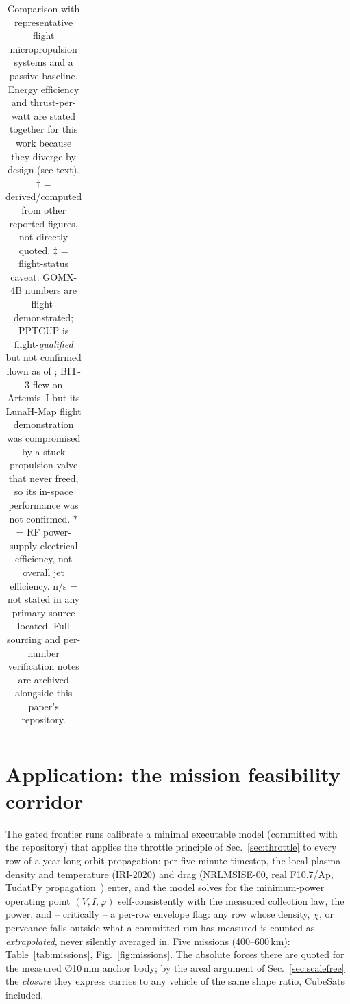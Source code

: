 \documentclass[11pt]{article}
\begin{document}
\begin{table}
\begin{tabular}{p{2.1cm}p{3.0cm}p{1.9cm}p{1.7cm}p{1.5cm}p{1.3cm}p{3.0cm}p{1.5cm}}
\bottomrule
\end{tabular}
\caption{Comparison with representative flight micropropulsion systems and a
passive baseline. Energy efficiency and thrust-per-watt are stated together
for this work because they diverge by design (see text). $\dagger$ =
derived/computed from other reported figures, not directly quoted.
$\ddagger$ = flight-status caveat: GOMX-4B numbers are flight-demonstrated;
PPTCUP is flight-\emph{qualified} but not confirmed flown as of
\protect\cite{nasasoa26}; BIT-3 flew on Artemis~I but its LunaH-Map flight
demonstration was compromised by a stuck propulsion valve that never freed,
so its in-space performance was not confirmed. $*$ = RF power-supply
electrical efficiency, not overall jet efficiency. n/s = not stated in any
primary source located. Full sourcing and per-number verification notes are
archived alongside this paper's repository.}
\label{tab:comparison}
\end{table}

\section{Application: the mission feasibility corridor}
\label{sec:application}
The gated frontier runs calibrate a minimal executable model (committed with
the repository) that applies the throttle principle of
Sec.~\ref{sec:throttle} to every row of a year-long orbit propagation: per
five-minute timestep, the local plasma density and temperature (IRI-2020)
and drag (NRLMSISE-00, real F10.7/Ap, TudatPy
propagation~\cite{tudat}) enter, and the model solves for the minimum-power
operating point $(V, I, \varphi)$ self-consistently with the measured
collection law, the power, and -- critically
-- a per-row envelope flag: any row whose density, $\chi$, or perveance
falls outside what a committed run has measured is counted as
\emph{extrapolated}, never silently averaged in. Five missions
(400--600\,km): Table~\ref{tab:missions}, Fig.~\ref{fig:missions}. The
absolute forces there are quoted for the measured \O10\,mm anchor body; by
the areal argument of Sec.~\ref{sec:scalefree} the \emph{closure} they
express carries to any vehicle of the same shape ratio, CubeSats included.
\end{document}
